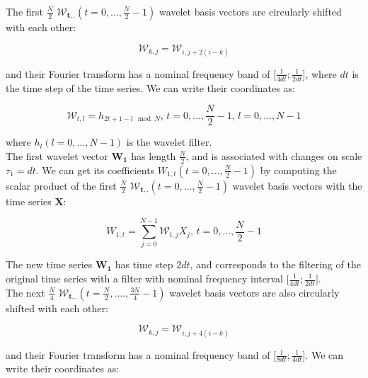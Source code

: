 \documentclass[main.tex]{subfiles}
\begin{document}
The first $\frac{N}{2}$ $\bm{\mathcal{W}_{t , .}} \left( t = 0 , ... , \frac{N}{2} - 1 \right)$ wavelet basis vectors are circularly shifted with each other:

\begin{equation}
\mathcal{W}_{k , j} = \mathcal{W}_{i , j + 2 \left( i - k \right)}
\end{equation}

and their Fourier transform has a nominal frequency band of $\lbrack \frac{1}{4 dt} ; \frac{1}{2 dt} \rbrack$, where $dt$ is the time step of the time series. We can write their coordinates as:

\begin{equation}
\mathcal{W}_{t , l} = h_{2 t + 1 - l \mod N} \text{, } t = 0 , ... , \frac{N}{2} - 1 \text{, } l = 0 , ... , N - 1
\end{equation}

where $h_l \left( l = 0 , ... , N - 1 \right)$ is the wavelet filter. \\

The first wavelet vector $\bm{W_1}$ has length $\frac{N}{2}$, and is associated with changes on scale $\tau_1 = dt$. We can get its coefficients $W_{1 , t} \left(t = 0 , ... , \frac{N}{2} - 1 \right)$ by computing the scalar product of the first $\frac{N}{2}$ $\bm{\mathcal{W}_{t , .}} \left( t = 0 , ... , \frac{N}{2} - 1 \right)$ wavelet basis vectors with the time series $\bm{X}$:

\begin{equation}
W_{1 , t} = \sum_{j = 0}^{N - 1} \mathcal{W}_{t , j} X_j \text{, } t = 0 , ... , \frac{N}{2} - 1
\end{equation}

The new time series $\bm{W_1}$ has time step $2 dt$, and corresponds to the filtering of the original time series with a filter with nominal frequency interval $\lbrack \frac{1}{4 dt} ; \frac{1}{2 dt} \rbrack$. \\

The next $\frac{N}{4}$ $\bm{\mathcal{W}_{t , .}} \left( t = \frac{N}{2} , .... , \frac{3 N}{4} - 1 \right)$ wavelet basis vectors are also circularly shifted with each other:

\begin{equation}
\mathcal{W}_{k , j} = \mathcal{W}_{i , j + 4 \left( i - k \right)}
\end{equation}

and their Fourier transform has a nominal frequency band of $\lbrack \frac{1}{8 dt} ; \frac{1}{4 dt} \rbrack$. We can write their coordinates as:
\end{document}
